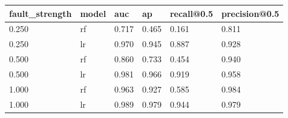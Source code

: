 \begin{tabular}{llllll}
\toprule
fault\_strength & model & auc & ap & recall@0.5 & precision@0.5 \\
\midrule
0.250 & rf & 0.717 & 0.465 & 0.161 & 0.811 \\
0.250 & lr & 0.970 & 0.945 & 0.887 & 0.928 \\
0.500 & rf & 0.860 & 0.733 & 0.454 & 0.940 \\
0.500 & lr & 0.981 & 0.966 & 0.919 & 0.958 \\
1.000 & rf & 0.963 & 0.927 & 0.585 & 0.984 \\
1.000 & lr & 0.989 & 0.979 & 0.944 & 0.979 \\
\bottomrule
\end{tabular}
